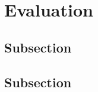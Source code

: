 \section{Evaluation}
\label{sec:evaluation}
\lipsum[8]

\subsection{Subsection}
\lipsum[8]

\subsection{Subsection}
\lipsum[8]